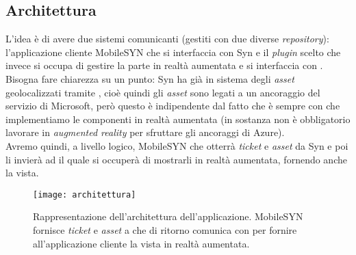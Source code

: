 \subsection{Architettura}
L'idea è di avere due sistemi comunicanti (gestiti con due diverse \textit{repository}): l'applicazione cliente MobileSYN che si interfaccia con Syn e il \textit{plugin} scelto che invece si occupa di gestire la parte in realtà aumentata e si interfaccia con \asa{}.\\
Bisogna fare chiarezza su un punto: Syn ha già in sistema degli \textit{asset} geolocalizzati tramite \asa{}, cioè quindi gli \textit{asset} sono legati a un ancoraggio del servizio di Microsoft, però questo è indipendente dal fatto che è sempre con \asa{} che implementiamo le componenti in realtà aumentata (in sostanza non è obbligatorio lavorare in \textit{augmented reality} per sfruttare gli ancoraggi di Azure).\\
Avremo quindi, a livello logico, MobileSYN che otterrà \textit{ticket} e \textit{asset} da Syn e poi li invierà ad \aplug{} il quale si occuperà di mostrarli in realtà aumentata, fornendo anche la vista.

\begin{figure}[H]
  \centering
  \texttt{[image: architettura]}\hfill
  \caption[Architettura \textit{app}]{Rappresentazione dell'architettura dell'applicazione. MobileSYN fornisce \textit{ticket} e \textit{asset} a \aplug{} che di ritorno comunica con \asa{} per fornire all'applicazione cliente la vista in realtà aumentata.}
\end{figure}

